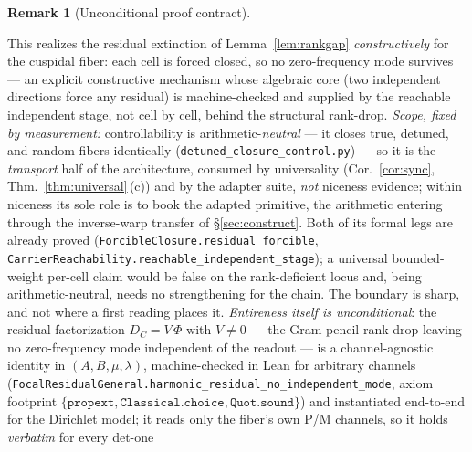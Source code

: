 \documentclass[11pt]{article}
\theoremstyle{definition}
\newtheorem{remark}[theorem]{Remark}
\begin{document}
\begin{remark}[Unconditional proof contract]
\begin{enumerate}
\noindent This realizes the residual extinction of Lemma~\ref{lem:rankgap} \emph{constructively} for the cuspidal
fiber: each cell is forced closed, so no zero-frequency mode survives --- an explicit constructive mechanism whose
algebraic core (two independent directions force any residual) is machine-checked and supplied by the reachable
independent stage, not cell by cell, behind the structural rank-drop. \emph{Scope, fixed by measurement:}
controllability is arithmetic-\emph{neutral} --- it closes true, detuned, and random fibers identically
(\texttt{detuned\_closure\_control.py}) --- so it is the \emph{transport} half of the architecture, consumed by
universality (Cor.~\ref{cor:sync}, Thm.~\ref{thm:universal}\,(c)) and by the adapter suite, \emph{not} niceness
evidence; within niceness its sole role is to book the adapted primitive, the arithmetic entering through the
inverse-warp transfer of \S\ref{sec:construct}. Both of its formal legs are already proved
(\texttt{ForcibleClosure.residual\_forcible}, \texttt{CarrierReachability.reachable\_independent\_stage}); a
universal bounded-weight per-cell claim would be false on the rank-deficient locus and, being
arithmetic-neutral, needs no strengthening for the chain. The boundary is sharp, and not where a first reading places it. \emph{Entireness itself is
unconditional}: the residual factorization $D_C=V\,\Phi$ with $V\neq0$ --- the Gram-pencil rank-drop leaving no
zero-frequency mode independent of the readout --- is a channel-agnostic identity in $(A,B,\mu,\lambda)$,
machine-checked in Lean for arbitrary channels
(\texttt{FocalResidualGeneral.harmonic\_residual\_no\_independent\_mode}, axiom footprint
$\{\texttt{propext},\texttt{Classical.choice},\texttt{Quot.sound}\}$) and instantiated end-to-end for the
Dirichlet model; it reads only the fiber's own P/M channels, so it holds \emph{verbatim} for every det-one

\end{enumerate}
\end{remark}
\end{document}
